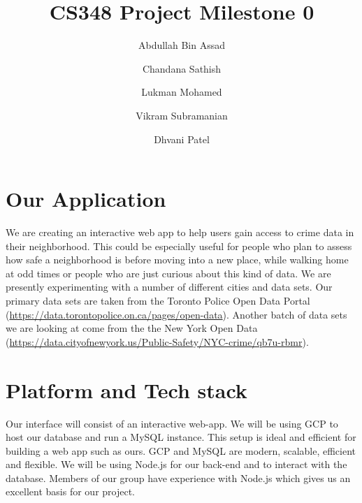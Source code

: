 \documentclass{article}
\title{CS348 Project Milestone 0}
\author{Abdullah Bin Assad\and Chandana Sathish \and Lukman Mohamed \and Vikram Subramanian \and Dhvani Patel}
\begin{document}
\maketitle

\section*{Our Application}
We are creating an interactive web app to help users gain access to crime data in their neighborhood. This could be especially useful for people who plan to assess how safe a neighborhood is before moving into a new place, while walking home at odd times or people who are just curious about this kind of data. We are presently experimenting with a number of different cities and data sets. Our primary data sets are taken from the Toronto Police Open Data Portal (\url{https://data.torontopolice.on.ca/pages/open-data}). Another batch of data sets we are looking at come from the  the New York Open Data (\url{https://data.cityofnewyork.us/Public-Safety/NYC-crime/qb7u-rbmr}). 
\section*{Platform and Tech stack}
Our interface will consist of an interactive web-app. We will be using GCP to host our database and run a MySQL instance. This setup is ideal and efficient for building a web app such as ours. GCP and MySQL are modern, scalable, efficient and flexible. We will be using Node.js for our back-end and to interact with the database. Members of our group have experience with Node.js which gives us an excellent basis for our project.
\end{document}
